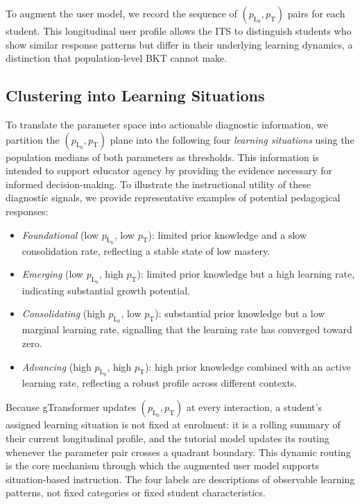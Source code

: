 \documentclass[runningheads]{llncs}
\begin{document}
To augment the user model, we record the sequence of $(p_{\text{L}_0}, p_{\text{T}})$ pairs for each student. This longitudinal user profile allows the ITS to distinguish students who show similar response patterns but differ in their underlying learning dynamics, a distinction that population-level BKT cannot make. 

\subsection{Clustering into Learning Situations}
\label{sec_situations}

To translate the parameter space into actionable diagnostic information, we partition the $(p_{\text{L}_0}, p_{\text{T}})$ plane into the following four \textit{learning situations} using the population medians of both parameters as thresholds. This information is intended to support educator agency by providing the evidence necessary for informed decision-making. To illustrate the instructional utility of these diagnostic signals, we provide representative examples of potential pedagogical responses:

\begin{itemize}
    \item \textit{Foundational} (low $p_{\text{L}_0}$, low $p_{\text{T}}$): limited prior knowledge and a slow consolidation rate, reflecting a stable state of low mastery.
    \item \textit{Emerging} (low $p_{\text{L}_0}$, high $p_{\text{T}}$): limited prior knowledge but a high learning rate, indicating substantial growth potential.
    \item \textit{Consolidating} (high $p_{\text{L}_0}$, low $p_{\text{T}}$): substantial prior knowledge but a low marginal learning rate, signalling that the learning rate has converged toward zero.
    \item \textit{Advancing} (high $p_{\text{L}_0}$, high $p_{\text{T}}$): high prior knowledge combined with an active learning rate, reflecting a robust profile across different contexts.
\end{itemize}

Because gTransformer updates $(p_{\text{L}_0}, p_{\text{T}})$ at every interaction, a student's assigned learning situation is not fixed at enrolment: it is a rolling summary of their current longitudinal profile, and the tutorial model updates its routing whenever the parameter pair crosses a quadrant boundary. This dynamic routing is the core mechanism through which the augmented user model supports situation-based instruction. The four labels are descriptions of observable learning patterns, not fixed categories or fixed student characteristics.
\end{document}
